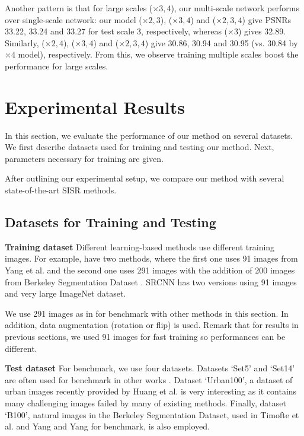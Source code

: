 \documentclass[10pt,twocolumn,letterpaper]{article}
\begin{document}
Another pattern is that for large scales ($\times 3,4$), our multi-scale network performs over single-scale network: our model ($\times 2,3$), ($\times 3,4$) and ($\times 2, 3,4$) give PSNRs 33.22, 33.24 and 33.27 for test scale 3, respectively, whereas ($\times 3$) gives 32.89. Similarly, ($\times 2,4$), ($\times 3,4$) and ($\times 2, 3,4$) give 30.86, 30.94 and 30.95 (vs. 30.84 by $\times 4$ model),  respectively. From this, we observe training multiple scales boost the performance for large scales.



\section{Experimental Results}
In this section, we evaluate the performance of our method on several datasets. We first describe datasets used for training and testing our method. Next, parameters necessary for training are given. 

After outlining our experimental setup, we compare our method with several state-of-the-art SISR methods. 

\subsection{Datasets for Training and Testing}
\textbf{Training dataset} Different learning-based methods use different training images. For example, \cite{schulter2015fast} have two methods, where the first one uses 91 images from Yang et al. \cite{yang2010image} and the second one uses 291 images with the addition of 200 images from Berkeley Segmentation Dataset \cite{Martin2001}. SRCNN \cite{dong2015image} has two versions using 91 images and very large ImageNet dataset. 

We use 291 images as in \cite{schulter2015fast} for benchmark with other methods in this section. In addition, data augmentation (rotation or flip) is used. Remark that for results in previous sections, we used 91 images for fast training so performances can be different. 

\textbf{Test dataset} For benchmark, we use four datasets. Datasets `Set5' \cite{bevilacqua2012} and `Set14' \cite{zeyde2012single} are often used for benchmark in other works \cite{Timofte,Timofte2013,Dong2014}. Dataset `Urban100', a dataset of urban images recently provided by Huang et al. \cite{Huang-CVPR-2015} is very interesting as it contains many challenging images failed by many of existing methods. Finally, dataset `B100', natural images in the Berkeley Segmentation Dataset, used in Timofte et al. \cite{Timofte} and Yang and Yang \cite{Yang2013} for benchmark, is also employed. 
\end{document}

